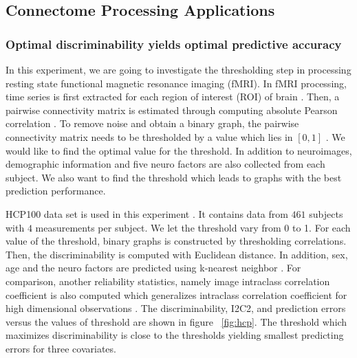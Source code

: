 \documentclass{article}
\begin{document}
\subsection{Connectome Processing Applications}

\subsubsection{Optimal discriminability yields optimal predictive accuracy}
In this experiment, we are going to investigate the thresholding step in processing resting state functional magnetic resonance imaging (fMRI). In fMRI processing, time series is first extracted for each region of interest (ROI) of brain \cite{strother2006evaluating}. Then, a pairwise connectivity matrix is estimated through computing absolute Pearson correlation \cite{liang2012effects}. To remove noise and obtain a binary graph, the pairwise connectivity matrix needs to be thresholded by a value which lies in $[0,1]$ \cite{hampson2002detection,van2010exploring}. We would like to find the optimal value for the threshold. In addition to neuroimages, demographic information and five neuro factors \cite{costa1992revised} are also collected from each subject. We also want to find the threshold which leads to graphs with the best prediction performance.  

HCP100 data set is used in this experiment \cite{van2012human}. It contains data from $461$ subjects with $4$ measurements per subject. We let the threshold vary from 0 to 1. For each value of the threshold, binary graphs is constructed by thresholding correlations. Then, the discriminability is computed with Euclidean distance. In addition, sex, age and the neuro factors are predicted using k-nearest neighbor \cite{vapnik1998statistical}. For comparison, another reliability statistics, namely image intraclass correlation coefficient is also computed which generalizes intraclass correlation coefficient for high dimensional observations \cite{shou2013quantifying}. The discriminability, I2C2, and prediction errors versus the values of threshold are shown in figure ~\ref{fig:hcp}. The threshold which maximizes discriminability is close to the thresholds yielding smallest predicting errors for three covariates. 
\end{document}

